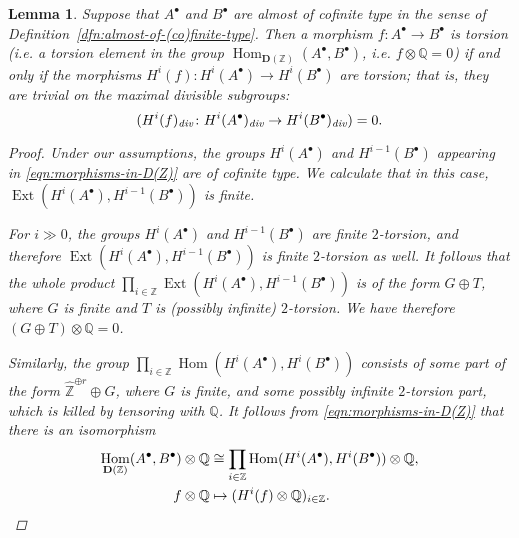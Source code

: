 \documentclass[leqno,12pt]{article}
\theoremstyle{plain}
\newtheorem{lemma}[theorem]{\indent\sc Lemma}
\theoremstyle{definition}
\DeclareMathOperator{\Hom}{Hom}
\DeclareMathOperator{\Ext}{Ext}
\newcommand{\QQ}{\mathbb{Q}}
\newcommand{\ZZ}{\mathbb{Z}}
\renewcommand{\div}{\text{\it div}}
\newcommand{\DZ}{{\mathbf{D} (\ZZ)}}
\begin{document}
\begin{lemma}
  \label{lemma:torsion-morphisms-in-D(Z)}
  Suppose that $A^\bullet$ and $B^\bullet$ are almost of cofinite type in the
  sense of Definition~{\rm\ref{dfn:almost-of-(co)finite-type}}. Then a morphism
  $f\colon A^\bullet\to B^\bullet$ is torsion (i.e. a torsion element in the
  group $\Hom_\DZ (A^\bullet, B^\bullet)$, i.e.  $f\otimes \mathbb{Q} = 0$) if
  and only if the morphisms $H^i (f)\colon H^i (A^\bullet) \to H^i (B^\bullet)$
  are torsion; that is, they are trivial on the maximal divisible subgroups:
  $$(H^i (f)_\div\colon H^i (A^\bullet)_\div \to H^i (B^\bullet)_\div) = 0.$$

  \begin{proof}
    Under our assumptions, the groups $H^i (A^\bullet)$ and
    $H^{i-1} (B^\bullet)$ appearing in \eqref{eqn:morphisms-in-D(Z)} are of
    cofinite type. We calculate that in this case,
    $\Ext (H^i (A^\bullet), H^{i-1} (B^\bullet))$ is finite.

    For $i \gg 0$, the groups $H^i (A^\bullet)$ and $H^{i-1} (B^\bullet)$ are
    finite $2$-torsion, and therefore
    $\Ext (H^i (A^\bullet), H^{i-1} (B^\bullet))$ is finite $2$-torsion as
    well. It follows that the whole product
    $\prod_{i\in \mathbb{Z}} \Ext (H^i (A^\bullet), H^{i-1} (B^\bullet))$ is of
    the form $G \oplus T$, where $G$ is finite and $T$ is (possibly infinite)
    $2$-torsion. We have therefore $(G \oplus T)\otimes \QQ = 0$.

    Similarly, the group
    $\prod_{i\in\ZZ} \Hom (H^i (A^\bullet), H^i (B^\bullet))$ consists of some
    part of the form $\widehat{\ZZ}^{\oplus r} \oplus G$, where $G$ is finite,
    and some possibly infinite $2$-torsion part, which is killed by tensoring
    with $\QQ$. It follows from \eqref{eqn:morphisms-in-D(Z)} that there is an
    isomorphism
    \begin{align*}
      \Hom_\DZ (A^\bullet, B^\bullet)\otimes \mathbb{Q} & \cong
      \prod_{i\in \mathbb{Z}} \Hom (H^i (A^\bullet), H^i (B^\bullet)) \otimes \mathbb{Q}, \\
      f\otimes\QQ & \mapsto (H^i (f) \otimes \QQ)_{i\in\ZZ}. \qedhere
    \end{align*}
  \end{proof}
\end{lemma}
\end{document}
